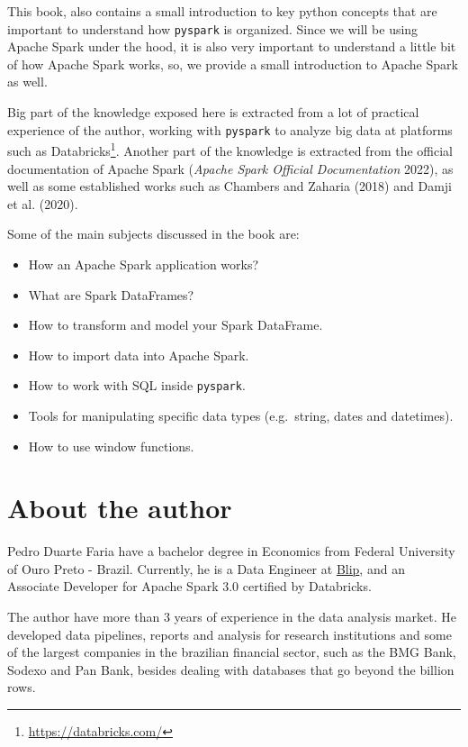 \documentclass[
  11pt,
  letterpaper,
  DIV=11,
  numbers=noendperiod]{scrreprt}
\providecommand{\tightlist}{%
  \setlength{\itemsep}{0pt}\setlength{\parskip}{0pt}}\usepackage{longtable,booktabs,array}
\begin{document}
This book, also contains a small introduction to key python concepts
that are important to understand how \texttt{pyspark} is organized.
Since we will be using Apache Spark under the hood, it is also very
important to understand a little bit of how Apache Spark works, so, we
provide a small introduction to Apache Spark as well.

Big part of the knowledge exposed here is extracted from a lot of
practical experience of the author, working with \texttt{pyspark} to
analyze big data at platforms such as Databricks\footnote{\url{https://databricks.com/}}.
Another part of the knowledge is extracted from the official
documentation of Apache Spark (\emph{Apache Spark Official
Documentation} 2022), as well as some established works such as Chambers
and Zaharia (2018) and Damji et al. (2020).

Some of the main subjects discussed in the book are:

\begin{itemize}
\tightlist
\item
  How an Apache Spark application works?
\item
  What are Spark DataFrames?
\item
  How to transform and model your Spark DataFrame.
\item
  How to import data into Apache Spark.
\item
  How to work with SQL inside \texttt{pyspark}.
\item
  Tools for manipulating specific data types (e.g.~string, dates and
  datetimes).
\item
  How to use window functions.
\end{itemize}

\hypertarget{about-the-author}{%
\section*{About the author}\label{about-the-author}}


Pedro Duarte Faria have a bachelor degree in Economics from Federal
University of Ouro Preto - Brazil. Currently, he is a Data Engineer at
\href{https://www.blip.ai/en/}{Blip}, and an Associate Developer for
Apache Spark 3.0 certified by Databricks.

The author have more than 3 years of experience in the data analysis
market. He developed data pipelines, reports and analysis for research
institutions and some of the largest companies in the brazilian
financial sector, such as the BMG Bank, Sodexo and Pan Bank, besides
dealing with databases that go beyond the billion rows.
\end{document}
